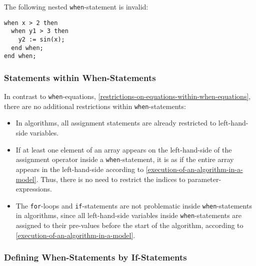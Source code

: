 \begin{example}
The following nested \lstinline!when!-statement is invalid:
\begin{lstlisting}[language=modelica]
when x > 2 then
  when y1 > 3 then
    y2 := sin(x);
  end when;
end when;
\end{lstlisting}
\end{example}

\subsubsection{Statements within When-Statements}\label{restrictions-on-statements-within-when-statements}\label{statements-within-when-statements}

\begin{nonnormative}
In contrast to \lstinline!when!-equations, \cref{restrictions-on-equations-within-when-equations}, there are no additional restrictions within \lstinline!when!-statements:
\begin{itemize}
\item
  In algorithms, all assignment statements are already restricted to left-hand-side variables.
\item
  If at least one element of an array appears on the left-hand-side of the assignment operator inside a \lstinline!when!-statement, it is as if the entire array appears in the left-hand-side according to \cref{execution-of-an-algorithm-in-a-model}.
  Thus, there is no need to restrict the indices to parameter-expressions.
\item
  The \lstinline!for!-loops and \lstinline!if!-statements are not problematic inside \lstinline!when!-statements in algorithms, since all left-hand-side variables inside \lstinline!when!-statements are assigned to their pre-values before the start of the algorithm, according to \cref{execution-of-an-algorithm-in-a-model}.
\end{itemize}
\end{nonnormative}

\subsubsection{Defining When-Statements by If-Statements}\label{defining-when-statements-by-if-statements}

